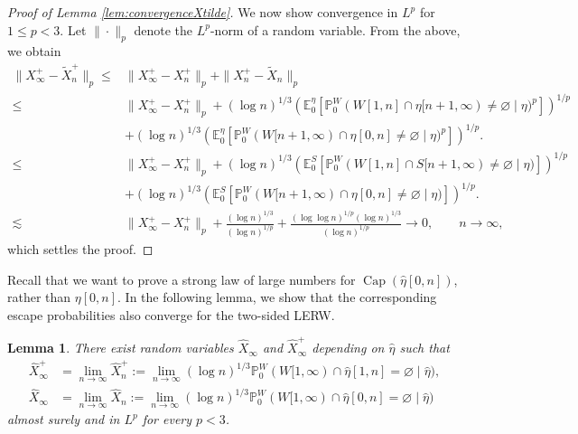 \documentclass{article}
\DeclareMathOperator{\Ca}{Cap}
\renewcommand{\P}{\mathbb{P}}
\newcommand{\E}{\mathbb{E}}
\newcommand{\1}{\mathbf{1}}
\newcommand{\limn}{\lim_{n\rightarrow\infty}}
\newcommand{\heta}{\hat\eta}
\newtheorem{lemma}[theorem]{Lemma}
\theoremstyle{definition}
\numberwithin{equation}{section}
\numberwithin{theorem}{section}
\begin{document}
\begin{proof}[Proof of Lemma \ref{lem:convergenceXtilde}]
We now show convergence in $L^p$ for $1\leq p<3$. Let $\|\cdot\|_p$ denote the $L^p$-norm of a random variable. From the above, we obtain
\begin{equation}\label{eq:lpconvergenceXntilde}
    \begin{split}
        \|X^+_\infty-\widetilde{X}^+_n\|_p\leq&\|X^+_\infty-X^+_n\|_p+\|X^+_n-\widetilde{X}_n\|_p\\
        \leq&\|X^+_\infty-X^+_n\|_p+(\log n)^{1/3}\left(\E^\eta_0\left[\P^W_0(W[1,n]\cap \eta[n+1,\infty)\neq\varnothing\mid\eta)^p\right]\right)^{1/p}\\
        &+(\log n)^{1/3}\left(\E^\eta_0\left[\P^W_0(W[n+1,\infty)\cap \eta[0,n]\neq\varnothing\mid\eta)^p\right]\right)^{1/p}.\\
        \leq&\|X^+_\infty-X^+_n\|_p+(\log n)^{1/3}\left(\E^S_0\left[\P^W_0(W[1,n]\cap S[n+1,\infty)\neq\varnothing\mid\eta)\right]\right)^{1/p}\\
        &+(\log n)^{1/3}\left(\E^S_0\left[\P^W_0(W[n+1,\infty)\cap \eta[0,n]\neq\varnothing\mid\eta)\right]\right)^{1/p}.\\
        \lesssim&\|X^+_\infty-X^+_n\|_p+\frac{(\log n)^{1/3}}{(\log n)^{1/p}}+\frac{(\log\log n)^{1/p}(\log n)^{1/3}}{(\log n)^{1/p}}\rightarrow0,\qquad n\rightarrow\infty,
    \end{split}
\end{equation}
which settles the proof.
\end{proof}

Recall that we want to prove a strong law of large numbers for $\Ca(\heta[0,n])$, rather than $\eta[0,n]$. In the following lemma, we show that the corresponding escape probabilities also converge for the two-sided LERW.
\begin{lemma}\label{lem:Xconvergencetwosided}
There exist random variables $\hat{X}_\infty$ and $\hat{X}^+_\infty$ depending on $\heta$ such that
\begin{equation}
    \begin{split}
        \hat{X}^+_\infty&=\limn \hat{X}^+_n:=\limn(\log n)^{1/3}\P^W_0(W[1,\infty)\cap\hat{\eta}[1,n]=\varnothing\mid \heta),\\
        \hat{X}_\infty&=\limn \hat{X}_n:=\limn(\log n)^{1/3}\P^W_0(W[1,\infty)\cap\hat{\eta}[0,n]=\varnothing\mid\heta)
    \end{split}
\end{equation}
almost surely and in $L^p$ for every $p<3$.
\end{lemma}
\end{document}
